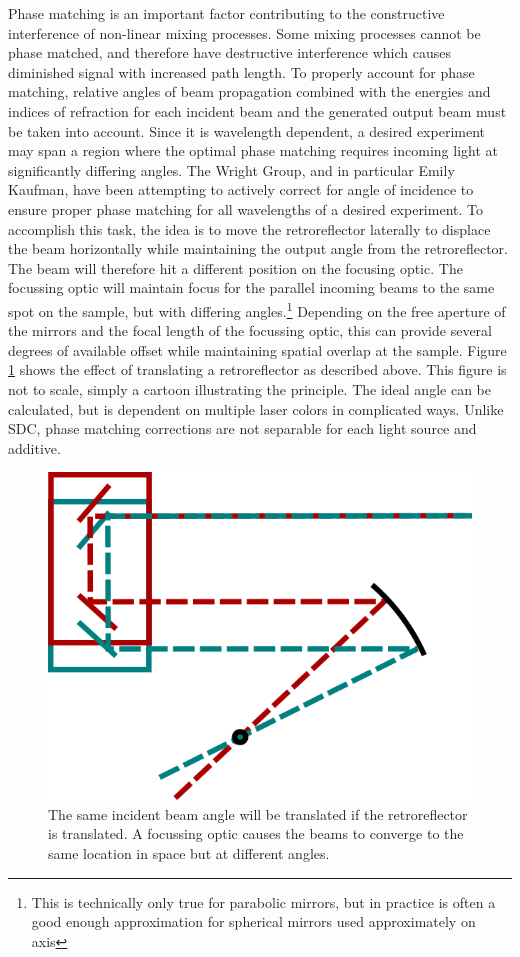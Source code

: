 Phase matching is an important factor contributing to the constructive interference of non-linear mixing processes. 
Some mixing processes cannot be phase matched, and therefore have destructive interference which causes diminished signal with increased path length.
To properly account for phase matching, relative angles of beam propagation combined with the energies and indices of refraction for each incident beam and the generated output beam must be taken into account.
Since it is wavelength dependent, a desired experiment may span a region where the optimal phase matching requires incoming light at significantly differing angles.
The Wright Group, and in particular Emily Kaufman, have been attempting to actively correct for angle of incidence to ensure proper phase matching for all wavelengths of a desired experiment.
To accomplish this task, the idea is to move the retroreflector laterally to displace the beam horizontally while maintaining the output angle from the retroreflector.
The beam will therefore hit a different position on the focusing optic.
The focussing optic will maintain focus for the parallel incoming beams to the same spot on the sample, but with differing angles.\footnote{This is technically only true for parabolic mirrors, but in practice is often a good enough approximation for spherical mirrors used approximately on axis}
Depending on the free aperture of the mirrors and the focal length of the focussing optic, this can provide several degrees of available offset while maintaining spatial overlap at the sample.
Figure \ref{act_corr:fig:phase_matching_angle} shows the effect of translating a retroreflector as described above.
This figure is not to scale, simply a cartoon illustrating the principle.
The ideal angle can be calculated, but is dependent on multiple laser colors in complicated ways.
Unlike SDC, phase matching corrections are not separable for each light source and additive.

\begin{figure}
\includegraphics[width=5in]{active_correction/images/phase_matching_angle}
\caption[Phase Matching Angle]{The same incident beam angle will be translated if the retroreflector is translated.
A focussing optic causes the beams to converge to the same location in space but at different angles.}
\label{act_corr:fig:phase_matching_angle}
\end{figure}


